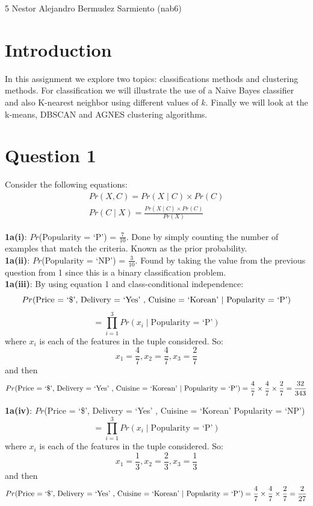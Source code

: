 \documentclass[11pt]{article}
\begin{document}
\homework
    {5}
    {Nestor Alejandro Bermudez Sarmiento (nab6)}
    {}


\section*{Introduction}

In this assignment we explore two topics: classifications methods and clustering methods.
For classification we will illustrate the use of a Naive Bayes classifier and also K-nearest neighbor using different values of $k$. Finally we will look at the k-means, DBSCAN and AGNES clustering algorithms.

\section*{Question 1}

Consider the following equations:\\
\begin{gather}
Pr(X, C) = Pr(X \mid C) \times Pr(C) \\	
Pr(C \mid X) = \frac{Pr(X \mid C) \times Pr(C)}{Pr(X)}
\end{gather}

\textbf{1a(i)}: $Pr$(Popularity = `P') = $\frac{7}{10}$. Done by simply counting the number of examples that match the criteria. Known as the prior probability.\\

\textbf{1a(ii)}: $Pr$(Popularity = `NP') = $\frac{3}{10}$. Found by taking the value from the previous question from 1 since this is a binary classification problem.\\

\textbf{1a(iii)}: By using equation 1 and class-conditional independence:
\[ Pr(\textrm{Price = `\$', Delivery = `Yes' , Cuisine = `Korean' \textbar{} Popularity = `P'}) \]
\[ = \prod_{i=1}^3 Pr(x_i \mid \textrm{Popularity = `P'}) \]
where $x_i$ is each of the features in the tuple considered. So:\\
\[ x_1 = \frac{4}{7}, x_2 = \frac{4}{7}, x_3 = \frac{2}{7} \] and then
\[ Pr(\textrm{Price = `\$', Delivery = `Yes' , Cuisine = `Korean' \textbar{} Popularity = `P'}) = \frac{4}{7} \times \frac{4}{7} \times \frac{2}{7} = \frac{32}{343} \]

\textbf{1a(iv)}: $Pr$(Price = `\$', Delivery = `Yes' , Cuisine = `Korean' \textbar{} Popularity = `NP')
\[ = \prod_{i=1}^3 Pr(x_i \mid \textrm{Popularity = `P'}) \]
where $x_i$ is each of the features in the tuple considered. So:\\
\[ x_1 = \frac{1}{3}, x_2 = \frac{2}{3}, x_3 = \frac{1}{3} \] and then
\[ Pr(\textrm{Price = `\$', Delivery = `Yes' , Cuisine = `Korean' \textbar{} Popularity = `P'}) = \frac{4}{7} \times \frac{4}{7} \times \frac{2}{7} = \frac{2}{27} \]
\end{document}
